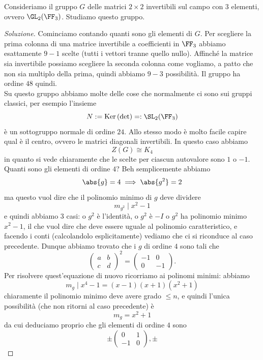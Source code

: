 \documentclass[11pt]{scrartcl}
\renewcommand{\ker}[1]{\text{Ker}\left(#1\right)}
\begin{document}
	\begin{exercise}[$\GL_2(\FF_3)$]
		Consideriamo il gruppo $G$ delle matrici $2\times 2$ invertibili sul campo con $3$ elementi, ovvero $\GL_2(\FF_3)$. Studiamo questo gruppo.
	\end{exercise}
	\begin{proof}[Soluzione]
		Cominciamo contando quanti sono gli elementi di $G$. Per scegliere la prima colonna di una matrice invertibile a coefficienti in $\FF_3$ abbiamo esattamente $9-1$ scelte (tutti i vettori tranne quello nullo). Affinché la matrice sia invertibile possiamo scegliere la seconda colonna come vogliamo, a patto che non sia multiplo della prima, quindi abbiamo $9-3$ possibilità. Il gruppo ha ordine $48$ quindi. \\
		Su questo gruppo abbiamo molte delle cose che normalmente ci sono sui gruppi classici, per esempio l'insieme
		$$N:=\ker{\det}=:\SL_2(\FF_3)$$
		è un sottogruppo normale di ordine $24$. Allo stesso modo è molto facile capire qual è il centro, ovvero le matrici diagonali invertibili. In questo caso abbiamo
		$$Z(G)\cong K_4$$
		in quanto si vede chiaramente che le scelte per ciascun autovalore sono $1$ o $-1$. \\
		Quanti sono gli elementi di ordine $4$? Beh semplicemente abbiamo
		$$\abs{g}=4 \implies \abs{g^2}=2$$
		ma questo vuol dire che il polinomio minimo di $g$ deve dividere
		$$m_{g^2}\mid x^2-1$$
		e quindi abbiamo $3$ casi: o $g^2$ è l'identità, o $g^2$ è $-I$ o $g^2$ ha polinomio minimo $x^2-1$, il che vuol dire che deve essere uguale al polinomio caratteristico, e facendo i conti (calcolandolo esplicitamente) vediamo che ci si riconduce al caso precedente. Dunque abbiamo trovato che i $g$ di ordine $4$ sono tali che
		$$
		\begin{pmatrix}
			a & b \\
			c & d
		\end{pmatrix}^2=
		\begin{pmatrix}
			-1 & 0 \\
			0 & -1
		\end{pmatrix}.
		$$
		Per risolvere quest'equazione di nuovo ricorriamo ai polinomi minimi: abbiamo
		$$m_g\mid x^4-1=(x-1)(x+1)(x^2+1)$$
		chiaramente il polinomio minimo deve avere grado $\le n$, e quindi l'unica possibilità (che non ritorni al caso precedente) è
		$$m_g=x^2+1$$
		da cui deduciamo proprio che gli elementi di ordine $4$ sono
		$$\pm
		\begin{pmatrix}
			0 & 1 \\
			-1 & 0
		\end{pmatrix},\pm
$$
\end{proof}
\end{document}
